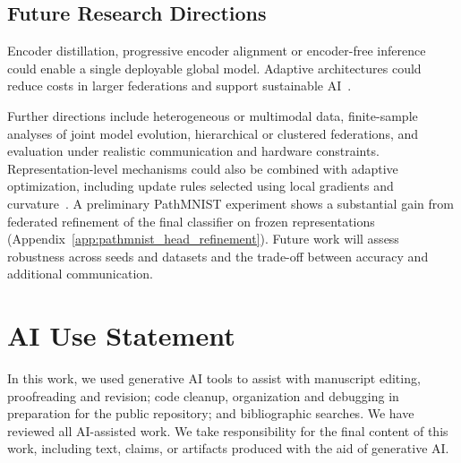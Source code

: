 \documentclass[twoside]{article}
\newif\ifcoauthorreview
\newcommand{\coauthordiffcolor}{\ifcoauthorreview\color[RGB]{0,70,140}\else\color[RGB]{0,0,0}\fi}
\theoremstyle{thmstyleone}%
\theoremstyle{thmstyletwo}%
\theoremstyle{thmstylethree}%
\begin{document}
\subsection{Future Research Directions}

Encoder distillation, progressive encoder alignment or encoder-free inference
could enable a single deployable global model. Adaptive architectures could
reduce costs in larger federations and support sustainable
AI~\cite{amato2024sustainability,veglio2026scalerl}.

Further directions include heterogeneous or multimodal data, finite-sample
analyses of joint model evolution, hierarchical or clustered federations,
and evaluation under realistic communication and hardware constraints.
Representation-level mechanisms could also be combined with adaptive
optimization, including update rules selected using local gradients and
curvature~\cite{dicecco2027eva}. {\coauthordiffcolor A preliminary PathMNIST
experiment shows a substantial gain from federated refinement of the final
classifier on frozen representations (Appendix~\ref{app:pathmnist_head_refinement}).
Future work will assess robustness across seeds and datasets and the trade-off
between accuracy and additional communication.}

\clearpage
\section*{AI Use Statement}

In this work, we used generative AI tools to assist with manuscript editing, proofreading and revision; code cleanup, organization and debugging in preparation for the public repository; and bibliographic searches. We have reviewed all AI-assisted work. We take responsibility for the final content of this work, including text, claims, or artifacts produced with the aid of generative AI. 










\begingroup
\let\coauthororiginalbibitem\bibitem
\def\coauthornewbibkey{luo2021nofear}
\renewcommand{\bibitem}[2][]{%
  \normalcolor%
  \coauthororiginalbibitem[#1]{#2}%
  \def\coauthorcurrentbibkey{#2}%
  \ifx\coauthorcurrentbibkey\coauthornewbibkey\coauthordiffcolor\fi%
}
\endgroup
\end{document}
